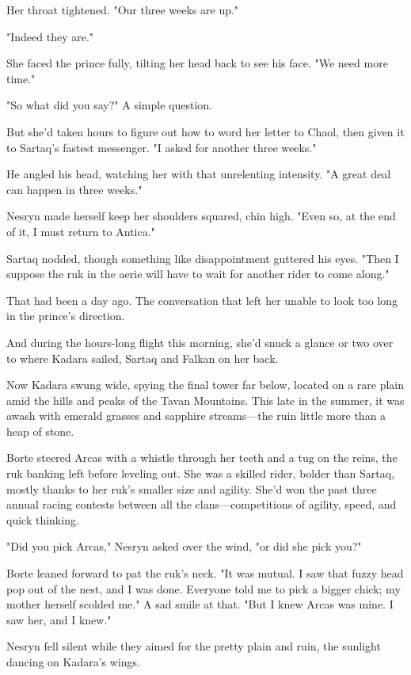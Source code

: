 Her throat tightened. "Our three weeks are up."

"Indeed they are."

She faced the prince fully, tilting her head back to see his face. "We need more time."

"So what did you say?" A simple question.

But she'd taken hours to figure out how to word her letter to Chaol, then given it to Sartaq's fastest messenger. "I asked for another three weeks."

He angled his head, watching her with that unrelenting intensity. "A great deal can happen in three weeks."

Nesryn made herself keep her shoulders squared, chin high. "Even so, at the end of it, I must return to Antica."

Sartaq nodded, though something like disappointment guttered his eyes. "Then I suppose the ruk in the aerie will have to wait for another rider to come along."

That had been a day ago. The conversation that left her unable to look too long in the prince's direction.

And during the hours-long flight this morning, she'd snuck a glance or two over to where Kadara sailed, Sartaq and Falkan on her back.

Now Kadara swung wide, spying the final tower far below, located on a rare plain amid the hills and peaks of the Tavan Mountains. This late in the summer, it was awash with emerald grasses and sapphire streams---the ruin little more than a heap of stone.

Borte steered Arcas with a whistle through her teeth and a tug on the reins, the ruk banking left before leveling out. She was a skilled rider, bolder than Sartaq, mostly thanks to her ruk's smaller size and agility. She'd won the past three annual racing contests between all the clans---competitions of agility, speed, and quick thinking.

"Did you pick Arcas," Nesryn asked over the wind, "or did she pick you?"

Borte leaned forward to pat the ruk's neck. "It was mutual. I saw that fuzzy head pop out of the nest, and I was done. Everyone told me to pick a bigger chick; my mother herself scolded me." A sad smile at that. "But I knew Arcas was mine. I saw her, and I knew."

Nesryn fell silent while they aimed for the pretty plain and ruin, the sunlight dancing on Kadara's wings.

